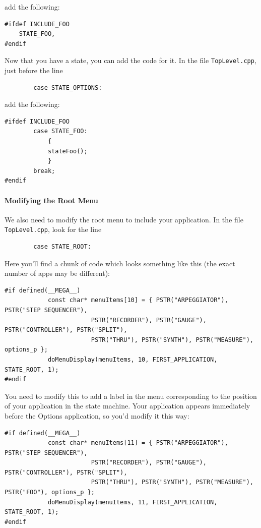 \documentclass{article}
\begin{document}
add the following:

\begin{verbatim}
#ifdef INCLUDE_FOO
    STATE_FOO,
#endif
\end{verbatim}

Now that you have a state, you can add the code for it.  In the file \texttt{TopLevel.cpp}, just before the line

\begin{verbatim}
        case STATE_OPTIONS:
\end{verbatim}

add the following:

\begin{verbatim}
#ifdef INCLUDE_FOO
        case STATE_FOO:
            {
            stateFoo();
            }
        break;
#endif
\end{verbatim}

\paragraph{Modifying the Root Menu}

We also need to modify the root menu to include your application.  In the file \texttt{TopLevel.cpp}, look for the line

\begin{verbatim}
        case STATE_ROOT:
\end{verbatim}

Here you'll find a chunk of code which looks something like this (the exact number of apps may be different):

\begin{verbatim}
#if defined(__MEGA__)
            const char* menuItems[10] = { PSTR("ARPEGGIATOR"), PSTR("STEP SEQUENCER"), 
                        PSTR("RECORDER"), PSTR("GAUGE"), PSTR("CONTROLLER"), PSTR("SPLIT"),
                        PSTR("THRU"), PSTR("SYNTH"), PSTR("MEASURE"), options_p };
            doMenuDisplay(menuItems, 10, FIRST_APPLICATION, STATE_ROOT, 1);
#endif
\end{verbatim}

You need to modify this to add a label in the menu corresponding to the position of your application in the state machine.  Your application appears immediately before the Options application, so you'd modify it this way:

\begin{verbatim}
#if defined(__MEGA__)
            const char* menuItems[11] = { PSTR("ARPEGGIATOR"), PSTR("STEP SEQUENCER"), 
                        PSTR("RECORDER"), PSTR("GAUGE"), PSTR("CONTROLLER"), PSTR("SPLIT"),
                        PSTR("THRU"), PSTR("SYNTH"), PSTR("MEASURE"), PSTR("FOO"), options_p };
            doMenuDisplay(menuItems, 11, FIRST_APPLICATION, STATE_ROOT, 1);
#endif
\end{verbatim}
\end{document}
